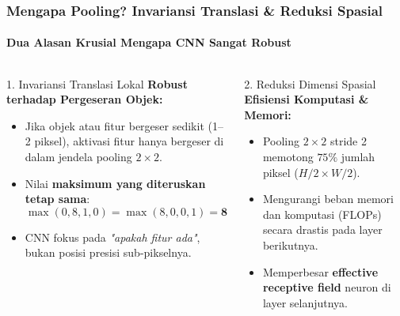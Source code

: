 \documentclass[t,aspectratio=169,xcolor=dvipsnames]{beamer}
\begin{document}
\begin{frame}
    \frametitle{Mengapa Pooling? Invariansi Translasi \& Reduksi Spasial}
    \framesubtitle{Dua Alasan Krusial Mengapa CNN Sangat Robust}
    \footnotesize

    \begin{columns}[t]
        \begin{block}{1. Invariansi Translasi Lokal}
            \textbf{Robust terhadap Pergeseran Objek:}
            \begin{itemize}
                \item Jika objek atau fitur bergeser sedikit (1--2 piksel), aktivasi fitur hanya bergeser di dalam jendela pooling $2\times2$.
                \item Nilai \textbf{maksimum yang diteruskan tetap sama}:
                $$\max(0, 8, 1, 0) = \max(8, 0, 0, 1) = \mathbf{8}$$
                \item CNN fokus pada \textit{"apakah fitur ada"}, bukan posisi presisi sub-pikselnya.
            \end{itemize}
        \end{block}

        \begin{exampleblock}{2. Reduksi Dimensi Spasial}
            \textbf{Efisiensi Komputasi \& Memori:}
            \begin{itemize}
                \item Pooling $2\times2$ stride 2 memotong $75\%$ jumlah piksel ($H/2 \times W/2$).
                \item Mengurangi beban memori dan komputasi (FLOPs) secara drastis pada layer berikutnya.
                \item Memperbesar \textbf{effective receptive field} neuron di layer selanjutnya.
            \end{itemize}
        \end{exampleblock}
    \end{columns}
\end{frame}
\end{document}
